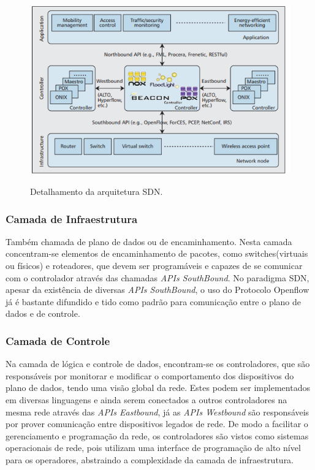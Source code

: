 \begin{figure}[!h]
    \caption{ Detalhamento da arquitetura SDN.}
    \centering\includegraphics[scale=0.8]{Imagens/ArquiteturaSDN.png}
    \label{ArquiteturaSDN.png}
\end{figure}
   
   \subsubsection{Camada de Infraestrutura}
   
   Também chamada de plano de dados ou de encaminhamento. Nesta camada concentram-se elementos de encaminhamento de pacotes, como switches(virtuais ou físicos) e roteadores, que devem ser programáveis e capazes de se comunicar com o controlador através das chamadas \emph{APIs SouthBound}. No paradigma SDN, apesar da existência de diversas \emph{APIs SouthBound}, o uso do Protocolo Openflow já é bastante difundido e tido como padrão para comunicação entre o plano de dados e de controle.\cite{kreutz} 

\subsubsection{Camada de Controle}

 Na camada de lógica e controle de dados, encontram-se os controladores, que são responsáveis por monitorar e modificar o comportamento dos dispositivos do plano de dados, tendo uma visão global da rede. Estes podem ser implementados em diversas linguagens e ainda serem conectados a outros controladores na mesma rede através das \emph{APIs Eastbound}, já as \emph{APIs Westbound} são responsáveis por prover comunicação entre dispositivos legados de rede. De modo a facilitar o gerenciamento e programação da rede, os controladores são vistos como sistemas operacionais de rede, pois utilizam uma interface de programação de alto nível para os operadores, abstraindo  a complexidade da camada de infraestrutura.\cite{McKeown:2008:OEI:1355734.1355746}
       

